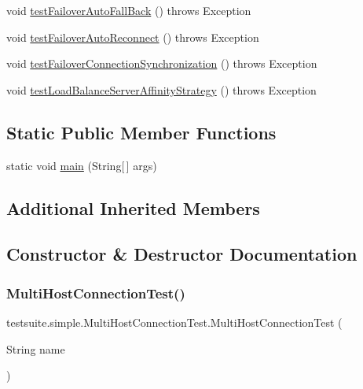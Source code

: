 \begin{DoxyCompactItemize}
\item 
void \mbox{\hyperlink{classtestsuite_1_1simple_1_1_multi_host_connection_test_adcb3eebcf1b9b863bf7c3e55e3af53f7}{test\+Failover\+Auto\+Fall\+Back}} ()  throws Exception 
\item 
void \mbox{\hyperlink{classtestsuite_1_1simple_1_1_multi_host_connection_test_a17cbfd2022e45098966fc67a16d7988a}{test\+Failover\+Auto\+Reconnect}} ()  throws Exception 
\item 
void \mbox{\hyperlink{classtestsuite_1_1simple_1_1_multi_host_connection_test_ac71b84115cf53abe97e4c697a4a6fd39}{test\+Failover\+Connection\+Synchronization}} ()  throws Exception 
\item 
void \mbox{\hyperlink{classtestsuite_1_1simple_1_1_multi_host_connection_test_ae9514e6473a1fcd37fc3a964e107f271}{test\+Load\+Balance\+Server\+Affinity\+Strategy}} ()  throws Exception 
\end{DoxyCompactItemize}
\subsection*{Static Public Member Functions}
\begin{DoxyCompactItemize}
\item 
static void \mbox{\hyperlink{classtestsuite_1_1simple_1_1_multi_host_connection_test_a57708373d1cad3d5c6f2672e6f3bdd04}{main}} (String\mbox{[}$\,$\mbox{]} args)
\end{DoxyCompactItemize}
\subsection*{Additional Inherited Members}


\subsection{Constructor \& Destructor Documentation}
\mbox{\label{classtestsuite_1_1simple_1_1_multi_host_connection_test_a56eb52dfde0f334b08b56d1065f60104}} 
\subsubsection{\texorpdfstring{Multi\+Host\+Connection\+Test()}{MultiHostConnectionTest()}}
{\footnotesize\ttfamily testsuite.\+simple.\+Multi\+Host\+Connection\+Test.\+Multi\+Host\+Connection\+Test (\begin{DoxyParamCaption}\item[{String}]{name }\end{DoxyParamCaption})}

